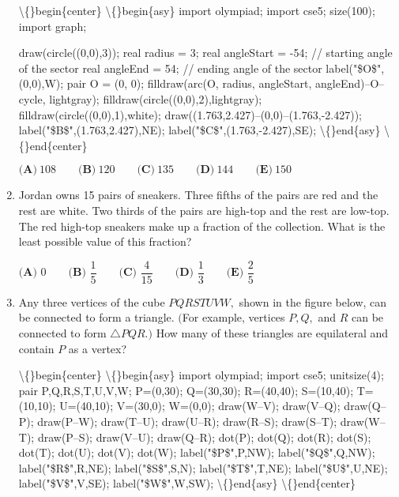 \documentclass{article}
\begin{document}
\begin{enumerate}[label=\arabic*., itemsep=0.5em]
\textbackslash\{\}begin\{center\}
\textbackslash\{\}begin\{asy\}
import olympiad;
import cse5;
size(100);
import graph;



draw(circle((0,0),3));
real radius = 3;
real angleStart = -54;  // starting angle of the sector
real angleEnd = 54;  // ending angle of the sector
label("\$O\$",(0,0),W);
pair O = (0, 0);
filldraw(arc(O, radius, angleStart, angleEnd)--O--cycle, lightgray);
filldraw(circle((0,0),2),lightgray);
filldraw(circle((0,0),1),white);
draw((1.763,2.427)--(0,0)--(1.763,-2.427));
label("\$B\$",(1.763,2.427),NE);
label("\$C\$",(1.763,-2.427),SE);
\textbackslash\{\}end\{asy\}
\textbackslash\{\}end\{center\}


\(\textbf{(A)}\ 108 \qquad \textbf{(B)}\ 120 \qquad \textbf{(C)}\ 135 \qquad \textbf{(D)}\ 144 \qquad \textbf{(E)}\ 150\)\par \vspace{0.5em}\item Jordan owns 15 pairs of sneakers. Three fifths of the pairs are red and the rest are white. Two thirds of the pairs are high-top and the rest are low-top. The red high-top sneakers make up a fraction of the collection. What is the least possible value of this fraction?




\(\textbf{(A) } 0\qquad\textbf{(B) } \dfrac{1}{5} \qquad\textbf{(C) } \dfrac{4}{15} \qquad\textbf{(D) } \dfrac{1}{3} \qquad\textbf{(E) } \dfrac{2}{5}\)\par \vspace{0.5em}\item Any three vertices of the cube \(PQRSTUVW,\) shown in the figure below, can be connected to form a triangle. \((\)For example, vertices \(P, Q,\) and \(R\) can be connected to form \(\triangle{PQR}.)\) How many of these triangles are equilateral and contain \(P\) as a vertex?


\textbackslash\{\}begin\{center\}
\textbackslash\{\}begin\{asy\}
import olympiad;
import cse5;
unitsize(4);
pair P,Q,R,S,T,U,V,W;
P=(0,30); Q=(30,30); R=(40,40); S=(10,40); T=(10,10); U=(40,10); V=(30,0); W=(0,0);
draw(W--V); draw(V--Q); draw(Q--P); draw(P--W); draw(T--U); draw(U--R); draw(R--S); draw(S--T); draw(W--T); draw(P--S); draw(V--U); draw(Q--R);
dot(P);
dot(Q);
dot(R);
dot(S);
dot(T);
dot(U);
dot(V);
dot(W);
label("\$P\$",P,NW);
label("\$Q\$",Q,NW);
label("\$R\$",R,NE);
label("\$S\$",S,N);
label("\$T\$",T,NE);
label("\$U\$",U,NE);
label("\$V\$",V,SE);
label("\$W\$",W,SW);
\textbackslash\{\}end\{asy\}
\textbackslash\{\}end\{center\}



\end{enumerate}
\end{document}
